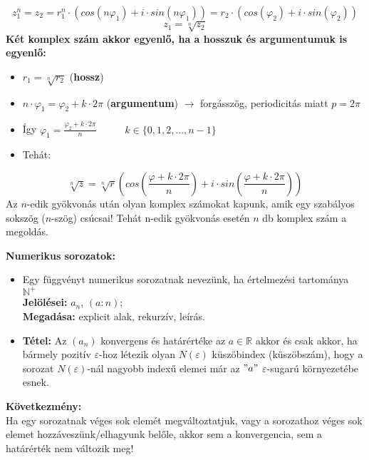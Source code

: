 \documentclass[12pt,a4paper]{article}
\begin{document}
\begin{tcolorbox}[colback=green!5!white,colframe=green!60!black,title= 6. Komplex számok gyökvonása]
$$z_1^n = z_2=r_1^n\cdot (cos(n\varphi_1)+i\cdot sin(n\varphi_1)) = r_2\cdot (cos(\varphi_2)+i\cdot sin(\varphi_2))$$  
$$z_1 = \sqrt[n]{z_2} $$  
\textbf{Két komplex szám akkor egyenlő, ha a hosszuk és argumentumuk is egyenlő:}
    \begin{itemize}
        \item \(r_1= \sqrt[n]{r_2}\) \hspace{61pt} (\textbf{hossz})
        \item \(n\cdot \varphi_1 = \varphi_2 + k\cdot 2\pi\) \hspace{10pt} (\textbf{argumentum}) \(\rightarrow\) forgásszög, periodicitás miatt \(p = 2\pi \)
        \item Így \(\varphi_1 = \frac{\varphi_2+k\cdot2\pi}{n} \hspace{30pt}\) \(k \in \{0, 1, 2, ... , n - 1\}\)
        \item Tehát: 
    \end{itemize}
    $$\sqrt[n]{z}= \sqrt[n]{r}(cos(\frac{\varphi+k\cdot2\pi}{n}) + i\cdot sin(\frac{\varphi+k\cdot2\pi}{n}))$$
    Az \(n\)-edik gyökvonás után olyan komplex számokat kapunk, amik egy szabályos sokszög
    (\(n\)-szög) csúcsai! Tehát n-edik gyökvonás esetén \(n\) db komplex szám a megoldás.
\end{tcolorbox}
\newpage

\textbf{Numerikus sorozatok:}

\begin{tcolorbox}[colback=green!5!white,colframe=green!60!black,title= 1. Numerikus sorozat határértéke]
    \begin{itemize}
        \item Egy függvényt numerikus sorozatnak nevezünk, ha értelmezési tartománya \(\mathbb{N}^+ \)\\
        \textbf{Jelölései:} \(a_n\), \((a:n)\);\\
        \textbf{Megadása:} explicit alak, rekurzív, leírás.
        \item \textbf{Tétel:} Az \((a_n)\) konvergens és határértéke az \(a \in \mathbb{R} \) akkor és csak akkor, ha bármely pozitív \(\varepsilon\)-hoz létezik olyan \(N(\varepsilon)\) küszöbindex (küszöbszám), hogy a sorozat \(N(\varepsilon)\)-nál nagyobb indexű elemei már az \("a"\) \(\varepsilon\)-sugarú környezetébe esnek.
    \end{itemize}
    \textbf{Következmény:}\\
    Ha egy sorozatnak véges sok elemét megváltoztatjuk, vagy a sorozathoz véges sok elemet
hozzáveszünk/elhagyunk belőle, akkor sem a konvergencia, sem a határérték nem változik
meg!
\end{tcolorbox}
\end{document}
